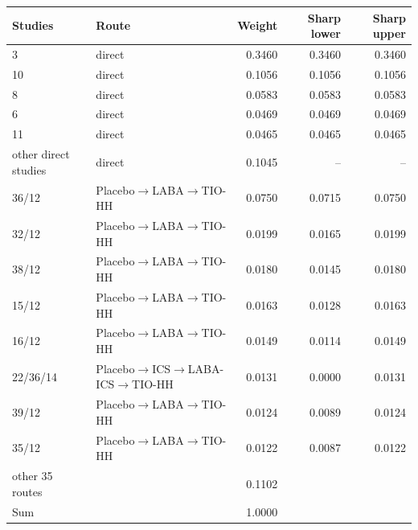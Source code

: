 \begin{tabular}{llrrr}
\toprule
Studies & Route & Weight & Sharp lower & Sharp upper \\
\midrule
3 & direct & 0.3460 & 0.3460 & 0.3460 \\
10 & direct & 0.1056 & 0.1056 & 0.1056 \\
8 & direct & 0.0583 & 0.0583 & 0.0583 \\
6 & direct & 0.0469 & 0.0469 & 0.0469 \\
11 & direct & 0.0465 & 0.0465 & 0.0465 \\
other direct studies & direct & 0.1045 & -- & -- \\
36/12 & Placebo$\to$LABA$\to$TIO-HH & 0.0750 & 0.0715 & 0.0750 \\
32/12 & Placebo$\to$LABA$\to$TIO-HH & 0.0199 & 0.0165 & 0.0199 \\
38/12 & Placebo$\to$LABA$\to$TIO-HH & 0.0180 & 0.0145 & 0.0180 \\
15/12 & Placebo$\to$LABA$\to$TIO-HH & 0.0163 & 0.0128 & 0.0163 \\
16/12 & Placebo$\to$LABA$\to$TIO-HH & 0.0149 & 0.0114 & 0.0149 \\
22/36/14 & Placebo$\to$ICS$\to$LABA-ICS$\to$TIO-HH & 0.0131 & 0.0000 & 0.0131 \\
39/12 & Placebo$\to$LABA$\to$TIO-HH & 0.0124 & 0.0089 & 0.0124 \\
35/12 & Placebo$\to$LABA$\to$TIO-HH & 0.0122 & 0.0087 & 0.0122 \\
other 35 routes & & 0.1102 & & \\
\midrule
Sum & & 1.0000 & & \\
\bottomrule
\end{tabular}
